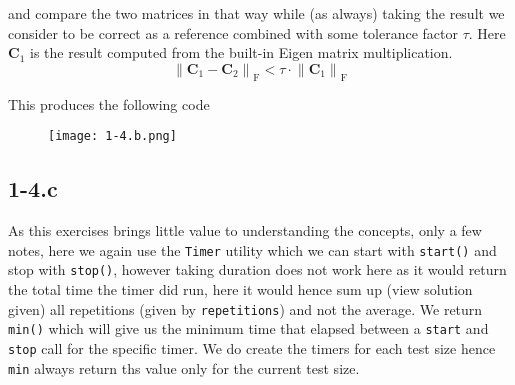 \documentclass{article}
\begin{document}
\noindent and compare the two matrices in that way while (as always) taking the result we consider to be correct as a reference combined with some tolerance factor $\tau$. Here $\mathbf{C}_{1}$ is the result computed from the built-in Eigen matrix multiplication.
\begin{equation*}
    \left\lVert \mathbf{C}_{1} - \mathbf{C}_{2}\right\rVert_{\mathrm{F}} < \tau \cdot \left\lVert \mathbf{C}_{1} \right\rVert_{\mathrm{F}} 
\end{equation*}

\noindent This produces the following code
 \begin{figure}[!hbt]
    \centering
\texttt{[image: 1-4.b.png]}
\end{figure}
\subsection*{1-4.c}
As this exercises brings little value to understanding the concepts, only a few notes, here we again use the \verb|Timer| utility which we can start with \verb|start()| and stop with \verb|stop()|, however taking duration does not work here as it would return the total time the timer did run, here it would hence sum up (view solution given) all repetitions (given by \verb|repetitions|) and not the average. We return \verb|min()| which will give us the minimum time that elapsed between a \verb|start| and \verb|stop| call for the specific timer. We do create the timers for each test size hence \verb|min| always return ths value only for the current test size.
\end{document}
